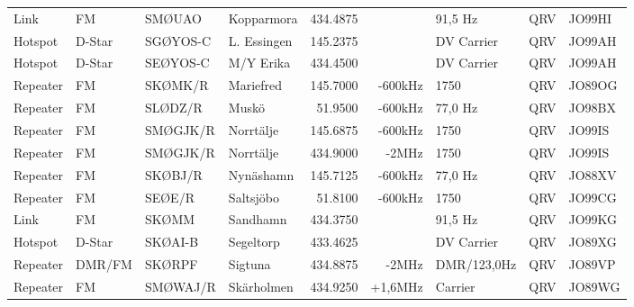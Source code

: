 \begin{landscape}
\begin{longtable}{llllrrlcl}
	Link               & FM           & SMØUAO        & Kopparmora   &          434.4875 &                & 91,5 Hz         &       QRV       & JO99HI           \\
	Hotspot            & D-Star       & SGØYOS-C      & L. Essingen  &          145.2375 &                & DV Carrier      &       QRV       & JO99AH           \\
	Hotspot            & D-Star       & SEØYOS-C      & M/Y Erika    &          434.4500 &                & DV Carrier      &       QRV       & JO99AH           \\
	Repeater           & FM           & SKØMK/R       & Mariefred    &          145.7000 &        -600kHz & 1750            &       QRV       & JO89OG           \\
	Repeater           & FM           & SLØDZ/R       & Muskö        &           51.9500 &        -600kHz & 77,0 Hz         &       QRV       & JO98BX           \\
	Repeater           & FM           & SMØGJK/R      & Norrtälje    &          145.6875 &        -600kHz & 1750            &       QRV       & JO99IS           \\
	Repeater           & FM           & SMØGJK/R      & Norrtälje    &          434.9000 &          -2MHz & 1750            &       QRV       & JO99IS           \\
	Repeater           & FM           & SKØBJ/R       & Nynäshamn    &          145.7125 &        -600kHz & 77,0 Hz         &       QRV       & JO88XV           \\
	Repeater           & FM           & SEØE/R        & Saltsjöbo    &           51.8100 &        -600kHz & 1750            &       QRV       & JO99CG           \\
	Link               & FM           & SKØMM         & Sandhamn     &          434.3750 &                & 91,5 Hz         &       QRV       & JO99KG           \\
	Hotspot            & D-Star       & SKØAI-B       & Segeltorp    &          433.4625 &                & DV Carrier      &       QRV       & JO89XG           \\
	Repeater           & DMR/FM       & SKØRPF        & Sigtuna      &          434.8875 &          -2MHz & DMR/123,0Hz     &       QRV       & JO89VP           \\
	Repeater           & FM           & SMØWAJ/R      & Skärholmen   &          434.9250 &        +1,6MHz & Carrier         &       QRV       & JO89WG           \\

\end{longtable}
\end{landscape}
